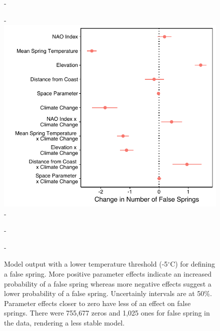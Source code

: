 \documentclass{article}\usepackage[]{graphicx}\usepackage[]{color}
\begin{document}
{\begin{figure} [H]
  -\begin{center}
  -\includegraphics[width=12cm]{..//figures/model_output_berniefive.pdf}
  -\caption{Model output with a lower temperature threshold (-5$^{\circ}$C) for defining a false spring. More positive parameter effects indicate an increased probability of a false spring whereas more negative effects suggest a lower probability of a false spring. Uncertainly intervals are at 50\%. Parameter effects closer to zero have less of an effect on false springs. There were 755,677 zeros and 1,025 ones for false spring in the data, rendering a less stable model.}\label{fig:five}
  -\end{center}
  -\end{figure}}
  

\end{document}
